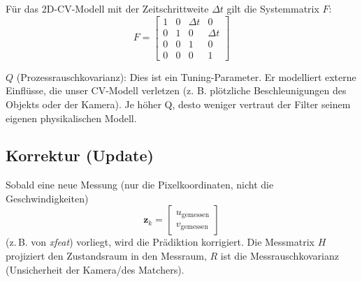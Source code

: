 \documentclass{article}
\begin{document}
Für das 2D-CV-Modell mit der Zeitschrittweite $\Delta t$ gilt die Systemmatrix $F$:
\begin{equation}
    F = \begin{bmatrix} 
    1 & 0 & \Delta t & 0 \\ 
    0 & 1 & 0 & \Delta t \\ 
    0 & 0 & 1 & 0 \\ 
    0 & 0 & 0 & 1 
    \end{bmatrix}
\end{equation}

$Q$ (Prozessrauschkovarianz): Dies ist ein Tuning-Parameter. Er modelliert externe Einflüsse, die unser CV-Modell verletzen (z. B. plötzliche Beschleunigungen des Objekts oder der Kamera). Je höher Q, desto weniger vertraut der Filter seinem eigenen physikalischen Modell.




\subsection{Korrektur (Update)}
Sobald eine neue Messung (nur die Pixelkoordinaten, nicht die Geschwindigkeiten)
\begin{equation}
    \mathbf{z}_k = \begin{bmatrix} u_{\text{gemessen}}\\ v_{\text{gemessen}} \end{bmatrix}
\end{equation}
(z.\,B. von \textit{xfeat}) vorliegt, wird die Prädiktion korrigiert. Die Messmatrix $H$ projiziert den Zustandsraum in den Messraum, $R$ ist die Messrauschkovarianz (Unsicherheit der Kamera/des Matchers).
\end{document}
